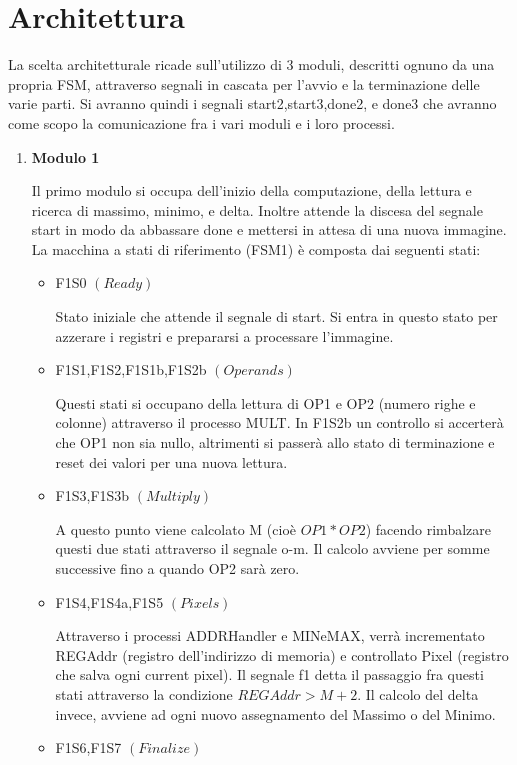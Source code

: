 \documentclass{article}
\begin{document}
\section{Architettura}
La scelta architetturale ricade sull'utilizzo di 3 moduli, descritti ognuno da una propria FSM, attraverso segnali in cascata per l'avvio e la terminazione delle varie parti. Si avranno quindi i segnali start2,start3,done2, e done3 che avranno come scopo la comunicazione fra i vari moduli e i loro processi.
 \begin{enumerate} 
  \item \textbf{Modulo 1} 
  
  Il primo modulo si occupa dell'inizio della computazione, della lettura e ricerca di massimo, minimo, e delta. Inoltre attende la discesa del segnale start in modo da abbassare done e mettersi in attesa di una nuova immagine. La macchina a stati di riferimento (FSM1) è composta dai seguenti stati:
  \begin{itemize}
  \item F1S0 \((Ready)\)
  
 Stato iniziale che attende il segnale di start. Si entra in questo stato per azzerare i registri e prepararsi a processare l'immagine.
  
    \item F1S1,F1S2,F1S1b,F1S2b \((Operands)\)
  
 Questi stati si occupano della lettura di OP1 e OP2 (numero righe e colonne) attraverso il processo MULT. In F1S2b un controllo si accerterà che OP1 non sia nullo, altrimenti si passerà allo stato di terminazione e reset dei valori per una nuova lettura.
  \item F1S3,F1S3b \((Multiply)\)
  
 A questo punto viene calcolato M (cioè \(OP1*OP2\)) facendo rimbalzare questi due stati attraverso il segnale o-m. Il calcolo avviene per somme successive fino a quando OP2 sarà zero. 
  \item F1S4,F1S4a,F1S5 \((Pixels)\)
  
  Attraverso i processi ADDRHandler e MINeMAX, verrà incrementato REGAddr (registro dell'indirizzo di memoria) e controllato Pixel (registro che salva ogni current pixel). Il segnale f1 detta il passaggio fra questi stati attraverso la condizione \(REGAddr > M + 2 \). Il calcolo del delta invece, avviene ad ogni nuovo assegnamento del Massimo o del Minimo.
  
  \item F1S6,F1S7 \((Finalize)\)
  

\end{itemize}
\end{enumerate}
\end{document}
